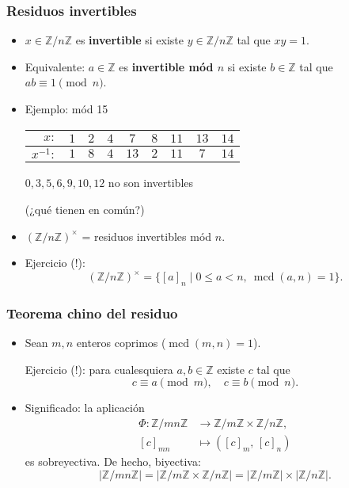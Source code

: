 \documentclass[handout]{beamer}
\newcommand{\ZZ}{\mathbb{Z}}
\DeclareMathOperator{\mcd}{mcd}
\begin{document}

\begin{frame}
  \frametitle{Residuos invertibles}

  \begin{itemize}
  \item<2-> $x \in \ZZ/n\ZZ$ es \textbf{invertible} si existe $y \in \ZZ/n\ZZ$ tal
    que $xy = 1$.

  \item<3-> Equivalente: $a \in \ZZ$ es \textbf{invertible mód $n$} si existe
    $b \in \ZZ$ tal que $ab \equiv 1 \pmod{n}$.

  \item<4-> Ejemplo: mód 15
    \begin{center}
      \begin{tabular}{rcccccccc}
        \hline
        $x\colon$ & $1$ & $2$ & $4$ & $7$ & $8$ & $11$ & $13$ & $14$ \\
        \hline
        $x^{-1}\colon$ & $1$ & $8$ & $4$ & $13$ & $2$ & $11$ & $7$ & $14$ \\
        \hline
      \end{tabular}
    \end{center}

    $0, 3, 5, 6, 9, 10, 12$ no son invertibles

    (¿qué tienen en común?)

  \item<5-> $(\ZZ/n\ZZ)^\times$ = residuos invertibles mód $n$.

  \item<6-> Ejercicio (!):
    $$(\ZZ/n\ZZ)^\times = \{ [a]_n \mid 0 \le a < n, ~ \mcd (a,n) = 1 \}.$$
  \end{itemize}
\end{frame}


\begin{frame}
  \frametitle{Teorema chino del residuo}

  \begin{itemize}
  \item<2-> Sean $m,n$ enteros coprimos ($\mcd (m,n) = 1$).

    Ejercicio (!): para cualesquiera $a,b \in \ZZ$ existe $c$ tal que
    $$c \equiv a \pmod{m}, \quad c \equiv b \pmod{n}.$$

  \item<3-> Significado: la aplicación
    \begin{align*}
      \Phi\colon \ZZ/mn\ZZ & \to \ZZ/m\ZZ \times \ZZ/n\ZZ,\\
      [c]_{mn} & \mapsto ([c]_m, \, [c]_n)
    \end{align*}
    es sobreyectiva. De hecho, biyectiva:
    $$|\ZZ/mn\ZZ| = |\ZZ/m\ZZ \times \ZZ/n\ZZ| = |\ZZ/m\ZZ| \times |\ZZ/n\ZZ|.$$
  \end{itemize}
\end{frame}
\end{document}
